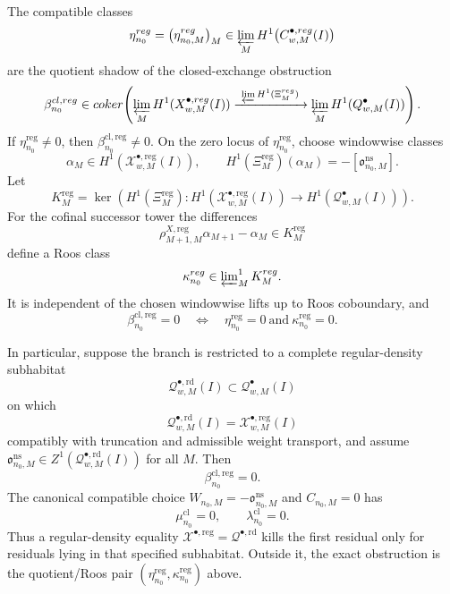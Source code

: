 \begin{prop}
  The compatible classes
  \[
    \eta^{\mathrm{reg}}_{n_0}
      =
    \bigl(\eta^{\mathrm{reg}}_{n_0,M}\bigr)_M
      \in
    \varprojlim_M
    H^1\bigl(\mathcal C^{\bullet,\mathrm{reg}}_{w,M}(I)\bigr)
  \]
  are the quotient shadow of the closed-exchange obstruction
  \[
    \beta^{\mathrm{cl},\mathrm{reg}}_{n_0}
      \in
      \operatorname{coker}\!\left(
        \varprojlim_M H^1(\mathcal X^{\bullet,\mathrm{reg}}_{w,M}(I))
        \xrightarrow{\ \varprojlim H^1(\Xi^{\mathrm{reg}}_M)\ }
        \varprojlim_M H^1(\mathcal Q^\bullet_{w,M}(I))
      \right).
  \]
  If \(\eta^{\mathrm{reg}}_{n_0}\neq0\), then
  \(\beta^{\mathrm{cl},\mathrm{reg}}_{n_0}\neq0\).  On the zero locus of
  \(\eta^{\mathrm{reg}}_{n_0}\), choose windowwise classes
  \[
    \alpha_M\in
    H^1(\mathcal X^{\bullet,\mathrm{reg}}_{w,M}(I)),
    \qquad
    H^1(\Xi^{\mathrm{reg}}_M)(\alpha_M)
      =
    -[\mathfrak o^{\mathrm{ns}}_{n_0,M}].
  \]
  Let
  \[
    K^{\mathrm{reg}}_M
      =
    \ker\!\left(
      H^1(\Xi^{\mathrm{reg}}_M)\colon
      H^1(\mathcal X^{\bullet,\mathrm{reg}}_{w,M}(I))
      \to
      H^1(\mathcal Q^\bullet_{w,M}(I))
    \right).
  \]
  For the cofinal successor tower the differences
  \[
    \rho^{X,\mathrm{reg}}_{M+1,M}\alpha_{M+1}-\alpha_M
      \in K^{\mathrm{reg}}_M
  \]
  define a Roos class
  \[
    \kappa^{\mathrm{reg}}_{n_0}
      \in
    \varprojlim\nolimits^1_M K^{\mathrm{reg}}_M.
  \]
  It is independent of the chosen windowwise lifts up to Roos
  coboundary, and
  \[
    \beta^{\mathrm{cl},\mathrm{reg}}_{n_0}=0
      \quad\Longleftrightarrow\quad
    \eta^{\mathrm{reg}}_{n_0}=0
      \ \text{and}\
    \kappa^{\mathrm{reg}}_{n_0}=0.
  \]

  In particular, suppose the branch is restricted to a complete
  regular-density subhabitat
  \[
    \mathcal Q^{\bullet,\mathrm{rd}}_{w,M}(I)
      \subset
    \mathcal Q^\bullet_{w,M}(I)
  \]
  on which
  \[
    \mathcal Q^{\bullet,\mathrm{rd}}_{w,M}(I)
      =
    \mathcal X^{\bullet,\mathrm{reg}}_{w,M}(I)
  \]
  compatibly with truncation and admissible weight transport, and assume
  \(\mathfrak o^{\mathrm{ns}}_{n_0,M}\in
  Z^1(\mathcal Q^{\bullet,\mathrm{rd}}_{w,M}(I))\) for all \(M\).  Then
  \[
    \beta^{\mathrm{cl},\mathrm{reg}}_{n_0}=0.
  \]
  The canonical compatible choice
  \(W_{n_0,M}=-\mathfrak o^{\mathrm{ns}}_{n_0,M}\) and \(C_{n_0,M}=0\)
  has
  \[
    \mu^{\mathrm{cl}}_{n_0}=0,\qquad
    \lambda^{\mathrm{cl}}_{n_0}=0.
  \]
  Thus a regular-density equality
  \(\mathcal X^{\bullet,\mathrm{reg}}=\mathcal Q^{\bullet,\mathrm{rd}}\)
  kills the first residual only for residuals lying in that specified
  subhabitat.  Outside it, the exact obstruction is the quotient/Roos pair
  \((\eta^{\mathrm{reg}}_{n_0},\kappa^{\mathrm{reg}}_{n_0})\) above.
\end{prop}

